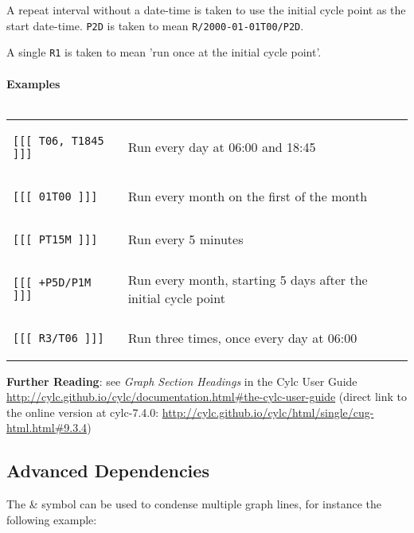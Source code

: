 A repeat interval without a date-time is taken to use the initial cycle point as the start date-time. \lstinline{P2D} is taken to mean \lstinline{R/2000-01-01T00/P2D}.

A single \lstinline{R1} is taken to mean 'run once at the initial cycle point'.

\paragraph*{Examples} $ $

\begin{tabular}{l l}
\begin{lstlisting}
[[[ T06, T1845 ]]]
\end{lstlisting}
& Run every day at 06:00 and 18:45\\
\begin{lstlisting}
[[[ 01T00 ]]]
\end{lstlisting}
& Run every month on the first of the month \\
\begin{lstlisting}
[[[ PT15M ]]]
\end{lstlisting}
& Run every 5 minutes \\
\begin{lstlisting}
[[[ +P5D/P1M ]]]
\end{lstlisting}
& Run every month, starting 5 days after the initial cycle point \\
\begin{lstlisting}
[[[ R3/T06 ]]]
\end{lstlisting}
& Run three times, once every day at 06:00
\\
\end{tabular}

\vspace{5mm}

\begin{shaded*}
  \textbf{Further Reading}: see {\em Graph Section Headings} in the Cylc User
  Guide \url{http://cylc.github.io/cylc/documentation.html#the-cylc-user-guide}
  (direct link to the online version at cylc-7.4.0:
  \url{http://cylc.github.io/cylc/html/single/cug-html.html#9.3.4})
\end{shaded*}


\subsection{Advanced Dependencies}

The \& symbol can be used to condense multiple graph lines, for instance the
following example:

